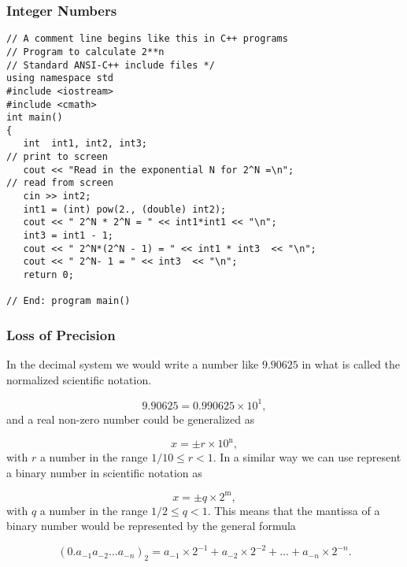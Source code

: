 \documentclass{beamer}
\newenvironment{block_mdfboxadmon}[1][]{\begin{block}{#1}}{\end{block}}
\begin{document}
\begin{frame}
\frametitle{Integer Numbers}

\begin{block_mdfboxadmon}
\begin{verbatim}
// A comment line begins like this in C++ programs
// Program to calculate 2**n
// Standard ANSI-C++ include files */
using namespace std
#include <iostream>
#include <cmath>
int main()
{
   int  int1, int2, int3;
// print to screen
   cout << "Read in the exponential N for 2^N =\n";
// read from screen
   cin >> int2;
   int1 = (int) pow(2., (double) int2);
   cout << " 2^N * 2^N = " << int1*int1 << "\n";
   int3 = int1 - 1;
   cout << " 2^N*(2^N - 1) = " << int1 * int3  << "\n";
   cout << " 2^N- 1 = " << int3  << "\n";
   return 0;

// End: program main()
\end{verbatim}
\end{block_mdfboxadmon}
\end{frame}

\begin{frame}
\frametitle{Loss of Precision}

\begin{block_mdfboxadmon}
In the decimal system we would write a number like $9.90625$
in what is called the normalized scientific notation.

\[
  9.90625=0.990625\times 10^{1},
\]
and a real non-zero number could be generalized as

\begin{equation}
    x=\pm r\times 10^{{\mbox{n}}},
\end{equation}
with $r$ a number in the range $1/10 \le r < 1$.
In a similar way we can use represent a binary number in
scientific notation as

\begin{equation}
    x=\pm q\times 2^{{\mbox{m}}},
\end{equation}
with $q$ a number in the range $1/2 \le q < 1$.
This means that the mantissa of a binary number would be represented by
the general formula

\begin{equation}
(0.a_{-1}a_{-2}\dots a_{-n})_2=a_{-1}\times 2^{-1}
+a_{-2}\times 2^{-2}+\dots+a_{-n}\times 2^{-n}.
\end{equation}
\end{block_mdfboxadmon}
\end{frame}
\end{document}
